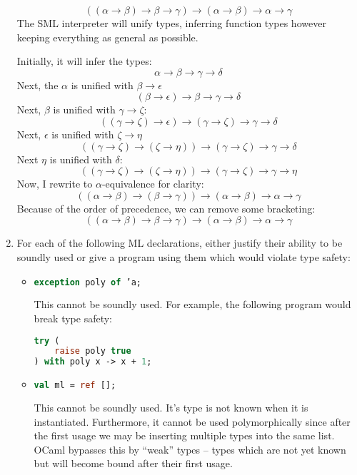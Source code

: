 \documentclass[10pt,\jkfside,a4paper]{article}
\begin{document}
\begin{enumerate}
\[
((\alpha \to \beta) \to \beta \to \gamma) \to (\alpha \to \beta) \to \alpha
\to \gamma
\]
The SML interpreter will unify types, inferring function types however
keeping everything as general as possible.

Initially, it will infer the types:
\[
\alpha \to \beta \to \gamma \to \delta
\]
Next, the  $\alpha$ is unified with $\beta \to \epsilon$
\[
(\beta \to \epsilon) \to \beta \to \gamma \to \delta
\]
Next, $\beta$ is unified with $\gamma \to \zeta$:
\[
((\gamma \to \zeta) \to \epsilon) \to (\gamma \to \zeta) \to \gamma \to \delta
\]
Next, $\epsilon$ is unified with $\zeta \to \eta$
\[
((\gamma \to \zeta) \to (\zeta \to \eta)) \to (\gamma \to \zeta) \to \gamma
\to \delta
\]
Next $\eta$ is unified with $\delta$:
\[
((\gamma \to \zeta) \to (\zeta \to \eta)) \to (\gamma \to \zeta) \to \gamma
\to \eta
\]
Now, I rewrite to $\alpha$-equivalence for clarity:
\[
((\alpha \to \beta) \to (\beta \to \gamma)) \to (\alpha \to \beta) \to \alpha
\to \gamma
\]
Because of the order of precedence, we can remove some bracketing:
\[
((\alpha \to \beta) \to \beta \to \gamma) \to (\alpha \to \beta) \to \alpha
\to \gamma
\]

\item For each of the following ML declarations, either justify their
ability to be soundly used or give a program using them which would violate
type safety:

\begin{itemize}

\item
\begin{lstlisting}[language=ML]
exception poly of ’a;
\end{lstlisting}

This cannot be soundly used. For example, the following program would break
type safety:
\begin{lstlisting}[language=ML]
try (
	raise poly true
) with poly x -> x + 1;
\end{lstlisting}

\item
\begin{lstlisting}[language=ML]
val ml = ref [];
\end{lstlisting}

This cannot be soundly used. It's type is not known when it is instantiated.
Furthermore, it cannot be used polymorphically since after the first usage
we may be inserting multiple types into the same list. OCaml bypasses this by
``weak'' types -- types which are not yet known but will become bound after
their first usage.

\end{itemize}

\end{enumerate}
\end{document}
